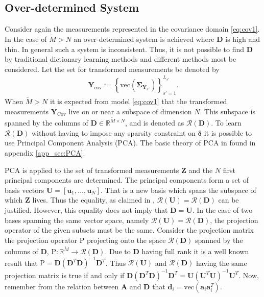 \subsection{Over-determined System}\label{sec:over_det}
Consider again the measurements represented in the covariance domain \eqref{eq:cov1}.
In the case of $\widetilde{M} > N$ an over-determined system is achieved where $\mathbf{D}$ is high and thin. 
In general such a system is inconsistent. 
Thus, it is not possible to find $\mathbf{D}$ by traditional dictionary learning methods and different methods most be considered.
Let the set for transformed measurements be denoted by 
\begin{align*}
\mathbf{Y}_{\text{cov}} := \left\{\text{vec}\left( \widehat{\boldsymbol{\Sigma}}_{\mathbf{Y}_{s'}} \right) \right\}_{s' = 1}^{L_{s'}}.
\end{align*}
When $ \widetilde{M} > N $ it is expected from model \eqref{eq:cov1} that the transformed measurements $\mathbf{Y}_{\text{Cov}}$ live on or near a subspace of dimension $N$. 
This subspace is spanned by the columns of $\mathbf{D} \in \mathbb{R}^{\widetilde{M} \times N}$, and is denoted as $\mathcal{R}(\mathbf{D})$. 
To learn $\mathcal{R}(\mathbf{D})$ without having to impose any sparsity constraint on $\boldsymbol{\delta}$ it is possible to use Principal Component Analysis (PCA). The basic theory of PCA in found in appendix \ref{app_sec:PCA}. 

PCA is applied to the set of transformed measurements $\mathbf{Z}$ and the $N$ first principal components are determined. 
The principal components form a set of basis vectors $\mathbf{U} = [\mathbf{u}_1, \dots, \mathbf{u}_N]$. 
That is a new basis which spans the subspace of which $\mathbf{Z}$ lives. 
Thus the equality, as claimed in \cite{Balkan2015}, $\mathcal{R}(\mathbf{U}) = \mathcal{R}(\mathbf{D})$ can be justified.  
However, this equality does not imply that $\mathbf{D} = \mathbf{U}$. 
In the case of two bases spanning the same vector space, namely $\mathcal{R}(\mathbf{U}) = \mathcal{R}(\mathbf{D})$, the projection operator of the given subsets must be the same. 
Consider the projection matrix the projection operator $\text{P}$ projecting onto the space $\mathcal{R}(\mathbf{D})$ spanned by the columns of $\mathbf{D}$, $\text{P}:\mathbb{R}^{\widetilde{M}}\rightarrow \mathcal{R}(\mathbf{D})$. 
Due to $\mathbf{D}$ having full rank it is a well known result that $\text{P} = \mathbf{D}(\mathbf{D}^T \mathbf{D})^{-1} \mathbf{D}^T$. 
Thus $\mathcal{R}(\mathbf{U})$ and $\mathcal{R}(\mathbf{D})$ having the same projection matrix is true if and only if $\mathbf{D} (\mathbf{D}^T\mathbf{D})^{-1} \mathbf{D}^T = \mathbf{U}(\mathbf{U}^T \mathbf{U})^{-1} \mathbf{U}^T$. 
Now, remember from the relation between $\mathbf{A}$ and $\mathbf{D}$ that $\mathbf{d}_i = \text{vec}(\mathbf{a}_i \mathbf{a}_i^T)$. 

